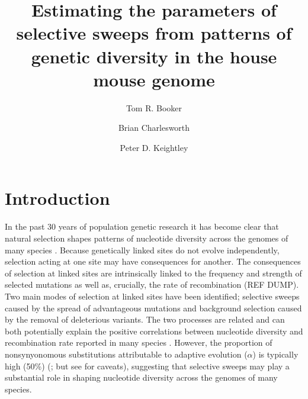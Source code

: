 \documentclass[11pt]{article}
\title{\textbf{Estimating the parameters of selective sweeps from patterns of genetic diversity in the house mouse genome}}
\author[1,*]{Tom R. Booker}
\author[1]{Brian Charlesworth}
\author[1]{Peter D. Keightley}
\affil[1]{Institute of Evolutionary Biology, University of Edinburgh, Edinburgh}
\affil[*]{\emph{t.r.booker@sms.ed.ac.uk}}
\begin{document}
\maketitle
\begin{abstract}


\end{abstract}

%
%

\section*{Introduction}

In the past 30 years of population genetic research it has become clear that natural selection shapes patterns of nucleotide diversity across the genomes of many species \citep{RN154, RN117}. Because genetically linked sites do not evolve independently, selection acting at one site may have consequences for another. The consequences of selection at linked sites are intrinsically linked to the frequency and strength of selected mutations as well as, crucially, the rate of recombination (REF DUMP). Two main modes of selection at linked sites have been identified; selective sweeps caused by the spread of advantageous mutations and background selection caused by the removal of deleterious variants. The two processes are related and can both potentially explain the positive correlations between nucleotide diversity and recombination rate reported in many species \citep{RN117}. However, the proportion of nonsynyonomous substitutions attributable to adaptive evolution ($\alpha$) is typically high (50\%) (\citealt{RN215}; but see \citealt{RN352} for caveats), suggesting that selective sweeps may play a substantial role in shaping nucleotide diversity across the genomes of many species.
\end{document}
